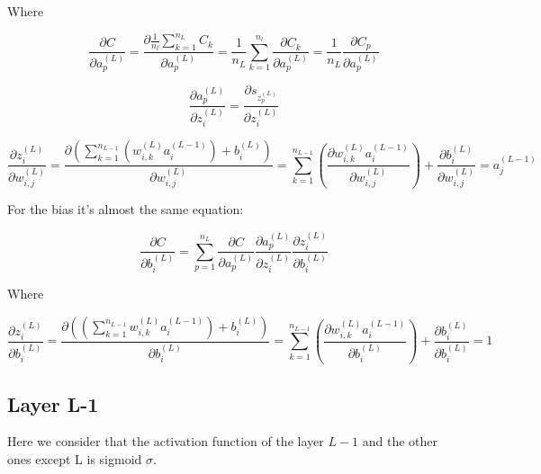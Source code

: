 \documentclass[11pt,a4paper]{report}
\begin{document}
Where

\begin{equation*}
    \frac{\partial C}{\partial a_p^{(L)}} = \frac{\partial \frac{1}{n_{l}} \sum\limits_{k=1}^{n_{L}} C_k}{\partial a_p^{(L)}} = \frac{1}{n_{L}} \sum\limits_{k=1}^{n_{l}} \frac{\partial C_k}{\partial a_p^{(L)}} = \frac{1}{n_{L}}\frac{\partial C_p}{\partial a_p^{(L)}}
\end{equation*}

\begin{equation*}
    \frac{\partial a_p^{(L)}}{\partial z_i^{(L)}} = \frac{\partial s_{z_p^{(L)}}}{\partial z_i^{(L)}}
\end{equation*}

\begin{equation*}
    \frac{\partial z_i^{(L)}}{\partial w_{i,j}^{(L)}} = \frac{\partial \left( \sum\limits_{k=1}^{n_{L-1}} \left(w_{i,k}^{(L)} a_i^{(L-1)}\right) + b_i^{(L)}\right)}{\partial w_{i,j}^{(L)}} = \sum\limits_{k=1}^{n_{L-1}}\left( \frac{\partial w_{i,k}^{(L)} a_i^{(L-1)}}{\partial w_{i,j}^{(L)}}\right) + \frac{\partial b_i^{(L)}}{\partial w_{i,j}^{(L)}} = a_j^{(L-1)}
\end{equation*}

For the bias it's almost the same equation:

\begin{equation*}
    \frac{\partial C}{\partial b_i^{(L)}} = \sum\limits_{p=1}^{n_{L}}\frac{\partial C}{\partial a_p^{(L)}} \frac{\partial a_p^{(L)}}{\partial z_i^{(L)}} \frac{\partial z_i^{(L)}}{\partial b_i^{(L)}}
\end{equation*}

Where

\begin{equation*}
    \frac{\partial z_i^{(L)}}{\partial b_i^{(L)}} = \frac{\partial \left( \left(\sum\limits_{k=1}^{n_{L-1}} w_{i,k}^{(L)} a_i^{(L-1)}\right) + b_i^{(L)}\right)}{\partial b_i^{(L)}} = \sum\limits_{k=1}^{n_{L-1}}\left( \frac{\partial w_{i,k}^{(L)} a_i^{(L-1)}}{\partial b_i^{(L)}}\right) + \frac{\partial b_i^{(L)}}{\partial b_i^{(L)}} = 1 
\end{equation*}

\subsection{Layer L-1}


Here we consider that the activation function of the layer $L-1$ and the other ones except L is sigmoid $\sigma$.
\end{document}
